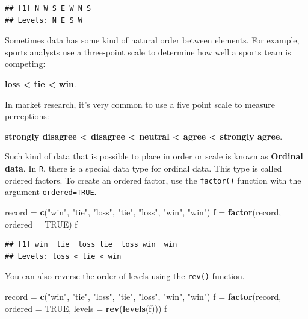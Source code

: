 \documentclass[
]{book}
\newenvironment{Shaded}{\begin{snugshade}}{\end{snugshade}}
\newcommand{\DataTypeTok}[1]{\textcolor[rgb]{0.13,0.29,0.53}{#1}}
\newcommand{\KeywordTok}[1]{\textcolor[rgb]{0.13,0.29,0.53}{\textbf{#1}}}
\newcommand{\NormalTok}[1]{#1}
\newcommand{\OtherTok}[1]{\textcolor[rgb]{0.56,0.35,0.01}{#1}}
\newcommand{\StringTok}[1]{\textcolor[rgb]{0.31,0.60,0.02}{#1}}
\begin{document}
\begin{verbatim}
## [1] N W S E W N S
## Levels: N E S W
\end{verbatim}

Sometimes data has some kind of natural order between elements. For example, sports analysts use a three-point scale to determine how well a sports team is competing:

\textbf{loss \textless{} tie \textless{} win}.

In market research, it's very common to use a five point scale to measure perceptions:

\textbf{strongly disagree \textless{} disagree \textless{} neutral \textless{} agree \textless{} strongly agree}.

Such kind of data that is possible to place in order or scale is known as \textbf{Ordinal data}. In \texttt{R}, there is a special data type for ordinal data. This type is called ordered factors. To create an ordered factor, use the \texttt{factor()} function with the argument \texttt{ordered=TRUE}.

\begin{Shaded}
\begin{Highlighting}[]
\NormalTok{record =}\StringTok{ }\KeywordTok{c}\NormalTok{(}\StringTok{"win"}\NormalTok{, }\StringTok{"tie"}\NormalTok{, }\StringTok{"loss"}\NormalTok{, }\StringTok{"tie"}\NormalTok{, }\StringTok{"loss"}\NormalTok{, }\StringTok{"win"}\NormalTok{, }\StringTok{"win"}\NormalTok{)}
\NormalTok{f =}\StringTok{ }\KeywordTok{factor}\NormalTok{(record, }
            \DataTypeTok{ordered =} \OtherTok{TRUE}\NormalTok{)}
\NormalTok{f}
\end{Highlighting}
\end{Shaded}

\begin{verbatim}
## [1] win  tie  loss tie  loss win  win 
## Levels: loss < tie < win
\end{verbatim}

You can also reverse the order of levels using the \texttt{rev()} function.

\begin{Shaded}
\begin{Highlighting}[]
\NormalTok{record =}\StringTok{ }\KeywordTok{c}\NormalTok{(}\StringTok{"win"}\NormalTok{, }\StringTok{"tie"}\NormalTok{, }\StringTok{"loss"}\NormalTok{, }\StringTok{"tie"}\NormalTok{, }\StringTok{"loss"}\NormalTok{, }\StringTok{"win"}\NormalTok{, }\StringTok{"win"}\NormalTok{)}
\NormalTok{f =}\StringTok{ }\KeywordTok{factor}\NormalTok{(record, }
            \DataTypeTok{ordered =} \OtherTok{TRUE}\NormalTok{, }
            \DataTypeTok{levels =} \KeywordTok{rev}\NormalTok{(}\KeywordTok{levels}\NormalTok{(f)))}
\NormalTok{f}
\end{Highlighting}
\end{Shaded}
\end{document}
